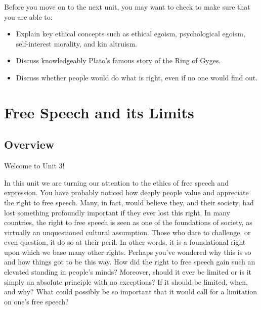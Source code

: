\documentclass[
]{book}
\providecommand{\tightlist}{%
  \setlength{\itemsep}{0pt}\setlength{\parskip}{0pt}}
\begin{document}
\begin{progress}
Before you move on to the next unit, you may want to check to make sure that you are able to:

\begin{itemize}
\tightlist
\item
  Explain key ethical concepts such as ethical egoism, psychological egoism, self-interest morality, and kin altruism.
\item
  Discuss knowledgeably Plato's famous story of the Ring of Gyges.
\item
  Discuss whether people would do what is right, even if no one would find out.
\end{itemize}
\end{progress}

\hypertarget{free-speech-and-its-limits}{%
\chapter{Free Speech and its Limits}\label{free-speech-and-its-limits}}

\hypertarget{overview-2}{%
\section*{Overview}\label{overview-2}}

Welcome to Unit 3!

In this unit we are turning our attention to the ethics of free speech and expression. You have probably noticed how deeply people value and appreciate the right to free speech. Many, in fact, would believe they, and their society, had lost something profoundly important if they ever lost this right. In many countries, the right to free speech is seen as one of the foundations of society, as virtually an unquestioned cultural assumption. Those who dare to challenge, or even question, it do so at their peril. In other words, it is a foundational right upon which we base many other rights. Perhaps you've wondered why this is so and how things got to be this way. How did the right to free speech gain such an elevated standing in people's minds? Moreover, should it ever be limited or is it simply an absolute principle with no exceptions? If it should be limited, when, and why? What could possibly be so important that it would call for a limitation on one's free speech?
\end{document}
